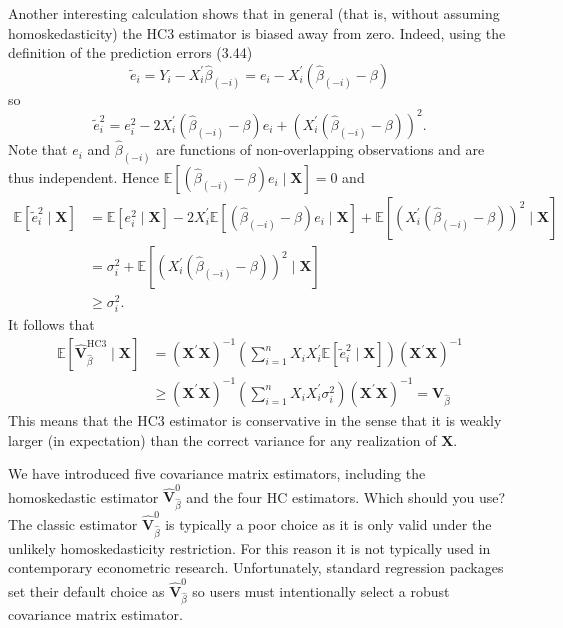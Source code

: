 \documentclass[10pt]{article}
\begin{document}
Another interesting calculation shows that in general (that is, without assuming homoskedasticity) the HC3 estimator is biased away from zero. Indeed, using the definition of the prediction errors (3.44)
$$
\widetilde{e}_{i}=Y_{i}-X_{i}^{\prime} \widehat{\beta}_{(-i)}=e_{i}-X_{i}^{\prime}\left(\widehat{\beta}_{(-i)}-\beta\right)
$$
so
$$
\widetilde{e}_{i}^{2}=e_{i}^{2}-2 X_{i}^{\prime}\left(\widehat{\beta}_{(-i)}-\beta\right) e_{i}+\left(X_{i}^{\prime}\left(\widehat{\beta}_{(-i)}-\beta\right)\right)^{2} .
$$
Note that $e_{i}$ and $\widehat{\beta}_{(-i)}$ are functions of non-overlapping observations and are thus independent. Hence $\mathbb{E}\left[\left(\widehat{\beta}_{(-i)}-\beta\right) e_{i} \mid \boldsymbol{X}\right]=0$ and
$$
\begin{aligned}
\mathbb{E}\left[\widetilde{e}_{i}^{2} \mid \boldsymbol{X}\right] &=\mathbb{E}\left[e_{i}^{2} \mid \boldsymbol{X}\right]-2 X_{i}^{\prime} \mathbb{E}\left[\left(\widehat{\beta}_{(-i)}-\beta\right) e_{i} \mid \boldsymbol{X}\right]+\mathbb{E}\left[\left(X_{i}^{\prime}\left(\widehat{\beta}_{(-i)}-\beta\right)\right)^{2} \mid \boldsymbol{X}\right] \\
&=\sigma_{i}^{2}+\mathbb{E}\left[\left(X_{i}^{\prime}\left(\widehat{\beta}_{(-i)}-\beta\right)\right)^{2} \mid \boldsymbol{X}\right] \\
& \geq \sigma_{i}^{2} .
\end{aligned}
$$
It follows that
$$
\begin{aligned}
\mathbb{E}\left[\widehat{\boldsymbol{V}}_{\widehat{\beta}}^{\mathrm{HC} 3} \mid \boldsymbol{X}\right] &=\left(\boldsymbol{X}^{\prime} \boldsymbol{X}\right)^{-1}\left(\sum_{i=1}^{n} X_{i} X_{i}^{\prime} \mathbb{E}\left[\tilde{e}_{i}^{2} \mid \boldsymbol{X}\right]\right)\left(\boldsymbol{X}^{\prime} \boldsymbol{X}\right)^{-1} \\
& \geq\left(\boldsymbol{X}^{\prime} \boldsymbol{X}\right)^{-1}\left(\sum_{i=1}^{n} X_{i} X_{i}^{\prime} \sigma_{i}^{2}\right)\left(\boldsymbol{X}^{\prime} \boldsymbol{X}\right)^{-1}=\boldsymbol{V}_{\widehat{\beta}}
\end{aligned}
$$
This means that the HC3 estimator is conservative in the sense that it is weakly larger (in expectation) than the correct variance for any realization of $\boldsymbol{X}$.

We have introduced five covariance matrix estimators, including the homoskedastic estimator $\widehat{\boldsymbol{V}}_{\widehat{\beta}}^{0}$ and the four HC estimators. Which should you use? The classic estimator $\widehat{\boldsymbol{V}}_{\widehat{\beta}}^{0}$ is typically a poor choice as it is only valid under the unlikely homoskedasticity restriction. For this reason it is not typically used in contemporary econometric research. Unfortunately, standard regression packages set their default choice as $\widehat{\boldsymbol{V}}_{\widehat{\beta}}^{0}$ so users must intentionally select a robust covariance matrix estimator.
\end{document}
